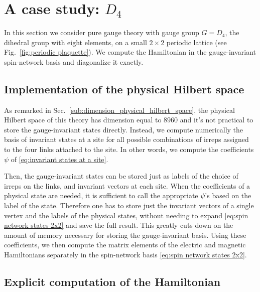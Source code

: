 \section{A case study: \texorpdfstring{$D_4$}{D4}}
\label{sec:a_case_study__d4}

\newcommand{\InvVector}[5]{\psi (
    j_{#1} m_{#1}
    j_{#2} m_{#2}
    j_{#3} n_{#3}
    j_{#4} n_{#4}
    | a_{#5}
)}
\newcommand{\InvVectorPrime}[5]{\psi (
    j_{#1}^\prime m_{#1}^\prime
    j_{#2}^\prime m_{#2}^\prime
    j_{#3}^\prime n_{#3}^\prime
    j_{#4}^\prime n_{#4}^\prime
    | a_{#5}^\prime
)}


In this section we consider pure gauge theory with gauge group $G=D_4$, the dihedral group with eight elements, on a small $2 \times 2 $ periodic lattice (see Fig.~\ref{fig:periodic plaquette}).
We compute the Hamiltonian in the gauge-invariant spin-network basis and diagonalize it exactly.

\subsection{Implementation of the physical Hilbert space}
\label{sub:implementation_of_the_physical_hilbert_space}

As remarked in Sec.~\ref{sub:dimension_physical_hilbert_space}, the physical Hilbert space of this theory has dimension equal to $8960$ and it's not practical to store the gauge-invariant states directly.
Instead, we compute numerically the basis of invariant states at a site for all possible combinations of irreps assigned to the four links attached to the site.
In other words, we compute the coefficients $\psi$ of \eqref{eq:invariant states at a site}.

Then, the gauge-invariant states can be stored just as labels of the choice of \acp{irrep} on the links, and invariant vectors at each site.
When the coefficients of a physical state are needed, it is sufficient to call the appropriate $\psi$'s based on the label of the state.
Therefore one has to store just the invariant vectors of a single vertex and the labels of the physical states, without needing to expand \eqref{eq:spin network states 2x2} and save the full result.
This greatly cuts down on the amount of memory necessary for storing the gauge-invariant basis.
Using these coefficients, we then compute the matrix elements of the electric and magnetic Hamiltonians separately in the spin-network basis \eqref{eq:spin network states 2x2}.


\subsection{Explicit computation of the Hamiltonian}
\label{sub:explicit_computation_of_the_hamiltonian}

